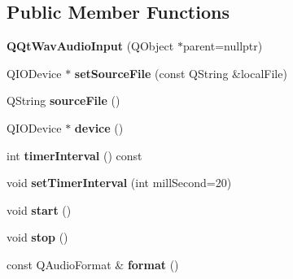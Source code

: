 \subsection*{Public Member Functions}
\begin{DoxyCompactItemize}
\item 
\mbox{\label{class_q_qt_wav_audio_input_a57bf9666b4ef414f444f4c71860e8932}} 
{\bfseries Q\+Qt\+Wav\+Audio\+Input} (Q\+Object $\ast$parent=nullptr)
\item 
\mbox{\label{class_q_qt_wav_audio_input_a11ac936b4db0932d58e106e0d5a03d14}} 
Q\+I\+O\+Device $\ast$ {\bfseries set\+Source\+File} (const Q\+String \&local\+File)
\item 
\mbox{\label{class_q_qt_wav_audio_input_adc643e5f6f6ea4709b5772ed850cef87}} 
Q\+String {\bfseries source\+File} ()
\item 
\mbox{\label{class_q_qt_wav_audio_input_aa3cc2e99384f792380719db50f6fe24a}} 
Q\+I\+O\+Device $\ast$ {\bfseries device} ()
\item 
\mbox{\label{class_q_qt_wav_audio_input_ab969eaa0e3c548b3b6b257712ce02baf}} 
int {\bfseries timer\+Interval} () const
\item 
\mbox{\label{class_q_qt_wav_audio_input_aa64d5a89549a5edb1b93f20391710627}} 
void {\bfseries set\+Timer\+Interval} (int mill\+Second=20)
\item 
\mbox{\label{class_q_qt_wav_audio_input_a5ea1d4793d2b2577ed1c6a3746e36c7b}} 
void {\bfseries start} ()
\item 
\mbox{\label{class_q_qt_wav_audio_input_a2f8b32ae5f647313ae379c5db655a2d7}} 
void {\bfseries stop} ()
\item 
\mbox{\label{class_q_qt_wav_audio_input_a8b3e5cff42178a0d68af73bede2f3eea}} 
const Q\+Audio\+Format \& {\bfseries format} ()
\item 
\mbox{\label{class_q_qt_wav_audio_input_a93cb308096589fe185cc6c83fdf6272a}} 

\end{DoxyCompactItemize}
